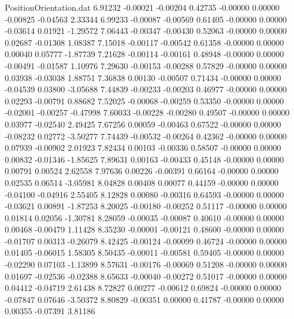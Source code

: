 \begin{filecontents}{PositionOrientation.dat}
   6.91232   -0.00021   -0.00204     0.42735   -0.00000    0.00000   -0.00825   -0.04563    2.33344
   6.99233   -0.00087   -0.00569     0.61405   -0.00000    0.00000   -0.03614    0.01921   -1.29572
   7.06443   -0.00347   -0.00430     0.52063   -0.00000    0.00000    0.02687   -0.01308    1.08387
   7.15018   -0.00117   -0.00542     0.61358   -0.00000    0.00000    0.00040    0.05777   -1.87739
   7.21628   -0.00114   -0.00161     0.48948   -0.00000    0.00000   -0.00491   -0.01587    1.10976
   7.29630   -0.00153   -0.00288     0.57829   -0.00000    0.00000    0.03938   -0.03038    1.88751
   7.36838    0.00130   -0.00507     0.71434   -0.00000    0.00000   -0.04539    0.03800   -3.05688
   7.44839   -0.00233   -0.00203     0.46977   -0.00000    0.00000    0.02293   -0.00791    0.88682
   7.52025   -0.00068   -0.00259     0.53350   -0.00000    0.00000   -0.02001   -0.00257   -0.47998
   7.60033   -0.00228   -0.00280     0.49507   -0.00000    0.00000    0.03977   -0.02540    2.49425
   7.67256    0.00059   -0.00463     0.67522   -0.00000    0.00000   -0.08232    0.02772   -3.50277
   7.74439   -0.00532   -0.00264     0.42362   -0.00000    0.00000    0.07939   -0.00902    2.01923
   7.82434    0.00103   -0.00336     0.58507   -0.00000    0.00000    0.00832   -0.01346   -1.85625
   7.89631    0.00163   -0.00433     0.45148   -0.00000    0.00000    0.00791    0.00524    2.62558
   7.97636    0.00226   -0.00391     0.66164   -0.00000    0.00000    0.02535    0.06514   -3.05981
   8.04828    0.00408    0.00077     0.44159   -0.00000    0.00000   -0.04100   -0.04916    2.55405
   8.12828    0.00080   -0.00316     0.64593   -0.00000    0.00000   -0.03621    0.00891   -1.87253
   8.20025   -0.00180   -0.00252     0.51117   -0.00000    0.00000    0.01814    0.02056   -1.30781
   8.28059   -0.00035   -0.00087     0.40610   -0.00000    0.00000    0.00468   -0.00479    1.11428
   8.35230   -0.00001   -0.00121     0.48600   -0.00000    0.00000   -0.01707    0.00313   -0.26079
   8.42425   -0.00124   -0.00099     0.46724   -0.00000    0.00000    0.01405   -0.06015    1.58305
   8.50435   -0.00011   -0.00581     0.59405   -0.00000    0.00000   -0.02290    0.07103   -1.13899
   8.57631   -0.00176   -0.00069     0.51208   -0.00000    0.00000    0.01697   -0.02536   -0.02388
   8.65633   -0.00040   -0.00272     0.51017   -0.00000    0.00000    0.04412   -0.04719    2.61438
   8.72827    0.00277   -0.00612     0.69824   -0.00000    0.00000   -0.07847    0.07646   -3.50372
   8.80829   -0.00351    0.00000     0.41787   -0.00000    0.00000    0.00355   -0.07391    3.81186

\end{filecontents}

